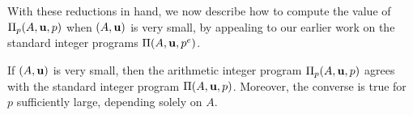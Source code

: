 \documentclass{amsart}
\begin{document}
With these reductions in hand, we now describe how to compute the value of $\Pi_p(A, \mathbf{u}, p)$ when $(A, \mathbf{u})$ is very small,  by appealing to our earlier work on the standard integer programs $\Pi(A, \mathbf{u}, p^e)$.

\begin{lemma}
   \label{ip = aip: L}
   If $(A,\mathbf{u})$ is very small, then the arithmetic integer program $\Pi_p(A, \mathbf{u}, p)$ agrees with the standard integer program $\Pi(A, \mathbf{u}, p)$.
   Moreover, the converse is true for $p$ sufficiently large, depending solely on $A$.
\end{lemma}
\end{document}
